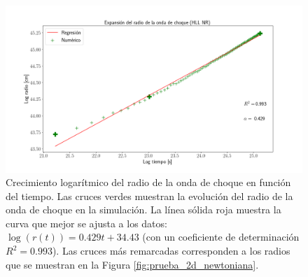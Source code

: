 \documentclass[12pt,a4paper]{book}
\begin{document}
\begin{figure}
  \centering
  \includegraphics[width=1\textwidth]{./Figuras/capitulo_3/prueba_2d_newtoniana/Expansion_HLL_NR_res_1000.png}
    \caption{Crecimiento logarítmico del radio de la onda de choque en función del tiempo. Las cruces verdes muestran la evolución del radio de la onda de choque en la simulación. La línea sólida roja muestra la curva que mejor 
    se ajusta a los datos: $\log(r(t))= 0.429t+34.43$ (con un coeficiente de determinación $R^2= 0.993$). Las cruces más remarcadas corresponden a los radios que se muestran en la Figura \ref{fig:prueba_2d_newtoniana}.}
    \label{fig:Expansion_HLL_NR}
\end{figure}
\end{document}
